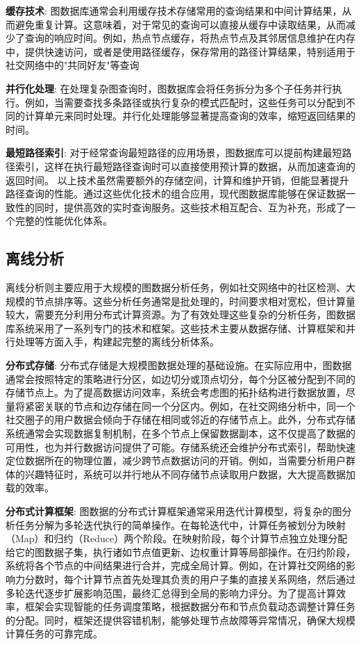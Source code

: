 \textbf{缓存技术}: 图数据库通常会利用缓存技术存储常用的查询结果和中间计算结果，从而避免重复计算。这意味着，对于常见的查询可以直接从缓存中读取结果，从而减少了查询的响应时间。例如，热点节点缓存，将热点节点及其邻居信息维护在内存中，提供快速访问，或者是使用路径缓存，保存常用的路径计算结果，特别适用于社交网络中的"共同好友"等查询


\textbf{并行化处理}: 在处理复杂图查询时，图数据库会将任务拆分为多个子任务并行执行。例如，当需要查找多条路径或执行复杂的模式匹配时，这些任务可以分配到不同的计算单元来同时处理。并行化处理能够显著提高查询的效率，缩短返回结果的时间。

\textbf{最短路径索引}: 对于经常查询最短路径的应用场景，图数据库可以提前构建最短路径索引，这样在执行最短路径查询时可以直接使用预计算的数据，从而加速查询的返回时间。
以上技术虽然需要额外的存储空间，计算和维护开销，但能显著提升路径查询的性能。通过这些优化技术的组合应用，现代图数据库能够在保证数据一致性的同时，提供高效的实时查询服务。这些技术相互配合、互为补充，形成了一个完整的性能优化体系。


\subsection{离线分析}

离线分析则主要应用于大规模的图数据分析任务，例如社交网络中的社区检测、大规模的节点排序等。这些分析任务通常是批处理的，时间要求相对宽松，但计算量较大，需要充分利用分布式计算资源。为了有效处理这些复杂的分析任务，图数据库系统采用了一系列专门的技术和框架。这些技术主要从数据存储、计算框架和并行处理等方面入手，构建起完整的离线分析体系。

\textbf{分布式存储}: 分布式存储是大规模图数据处理的基础设施。在实际应用中，图数据通常会按照特定的策略进行分区，如边切分或顶点切分，每个分区被分配到不同的存储节点上。为了提高数据访问效率，系统会考虑图的拓扑结构进行数据放置，尽量将紧密关联的节点和边存储在同一个分区内。例如，在社交网络分析中，同一个社交圈子的用户数据会倾向于存储在相同或邻近的存储节点上。此外，分布式存储系统通常会实现数据复制机制，在多个节点上保留数据副本，这不仅提高了数据的可用性，也为并行数据访问提供了可能。存储系统还会维护分布式索引，帮助快速定位数据所在的物理位置，减少跨节点数据访问的开销。例如，当需要分析用户群体的兴趣特征时，系统可以并行地从不同存储节点读取用户数据，大大提高数据加载的效率。

\textbf{分布式计算框架}: 图数据的分布式计算框架通常采用迭代计算模型，将复杂的图分析任务分解为多轮迭代执行的简单操作。在每轮迭代中，计算任务被划分为映射（Map）和归约（Reduce）两个阶段。在映射阶段，每个计算节点独立处理分配给它的图数据子集，执行诸如节点值更新、边权重计算等局部操作。在归约阶段，系统将各个节点的中间结果进行合并，完成全局计算。例如，在计算社交网络的影响力分数时，每个计算节点首先处理其负责的用户子集的直接关系网络，然后通过多轮迭代逐步扩展影响范围，最终汇总得到全局的影响力评分。为了提高计算效率，框架会实现智能的任务调度策略，根据数据分布和节点负载动态调整计算任务的分配。同时，框架还提供容错机制，能够处理节点故障等异常情况，确保大规模计算任务的可靠完成。

